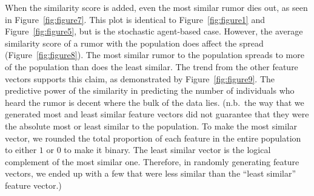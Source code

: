 When the similarity score is added, even the most similar rumor dies out, as seen in Figure~\ref{fig:figure7}.
This plot is identical to Figure~\ref{fig:figure1} and Figure~\ref{fig:figure5}, but is the stochastic agent-based case.
However, the average similarity score of a rumor with the population does affect the spread (Figure~\ref{fig:figure8}).
The most similar rumor to the population spreads to more of the population than does the least similar.
The trend from the other feature vectors supports this claim, as demonstrated by Figure~\ref{fig:figure9}.
The predictive power of the similarity in predicting the number of individuals who heard the rumor is decent where the bulk of the data lies.
(n.b.\ the way that we generated most and least similar feature vectors did not guarantee that they were the absolute most or least similar to the population.
To make the most similar vector, we rounded the total proportion of each feature in the entire population to either $ 1 $ or $ 0 $ to make it binary.
The least similar vector is the logical complement of the most similar one.
Therefore, in randomly generating feature vectors, we ended up with a few that were less similar than the ``least similar'' feature vector.)
